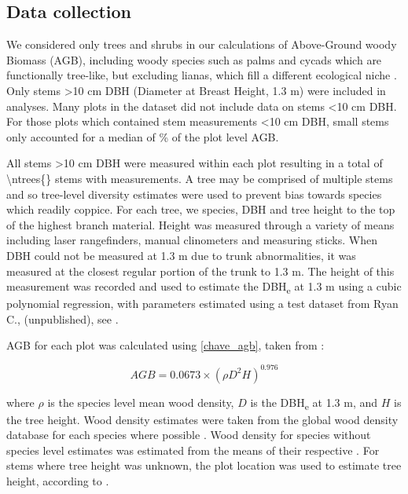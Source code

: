 \documentclass[11pt,a4paper]{article}
\begin{document}
\subsection{Data collection}
 
We considered only trees and shrubs in our calculations of Above-Ground woody Biomass (AGB), including woody species such as palms and cycads which are functionally tree-like, but excluding lianas, which fill a different ecological niche \citep{Selaya2008}. Only stems >10 cm DBH (Diameter at Breast Height, 1.3 m) were included in analyses. Many plots in the dataset did not include data on stems <10 cm DBH. For those plots which contained stem measurements <10 cm DBH, small stems only accounted for a median of \percsmallagb{}\% of the plot level AGB. 

All stems >10 cm DBH were measured within each plot resulting in a total of \num[group-separator={,}]{\ntrees{}} stems with measurements. A tree may be comprised of multiple stems and so tree-level diversity estimates were used to prevent bias towards species which readily coppice. For each tree, we  species, DBH and tree height to the top of the highest branch material. Height was measured through a variety of means including laser rangefinders, manual clinometers and measuring sticks. When DBH could not be measured at 1.3 m due to trunk abnormalities, it was measured at the closest regular portion of the trunk to 1.3 m. The height of this measurement was recorded and used to estimate the DBH\textsubscript{e} at 1.3 m using a cubic polynomial regression, with parameters estimated using a test dataset from Ryan C., (unpublished), see \citet{Godlee2020}.

AGB for each plot was calculated using \autoref{chave_agb}, taken from \citet{Chave2014}:

\begin{equation}
	AGB = 0.0673 \times (\rho D^{2} H)^{0.976}
	\label{chave_agb}
\end{equation}

where $\rho$ is the species level mean wood density, $D$ is the DBH\textsubscript{e} at 1.3 m, and $H$ is the tree height. Wood density estimates were taken from the global wood density database for each species where possible \citep{Chave2009, Zanne2009}. Wood density for species without species level estimates was estimated from the means of their respective . For stems where tree height was unknown, the plot location was used to estimate tree height, according to \citet{Chave2014}.
\end{document}
